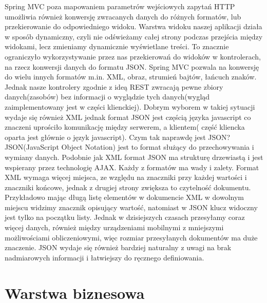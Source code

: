 Spring MVC poza mapowaniem parametrów wejściowych zapytań HTTP umożliwia również konwersję zwracanych danych do różnych formatów, lub przekierowanie do odpowiedniego widoku. Warstwa widoku naszej aplikacji działa w sposób dynamiczny, czyli nie odświeżamy całej strony podczas przejścia między widokami, lecz zmieniamy dynamicznie wyświetlane treści. To znacznie ograniczyło wykorzystywanie przez nas przekierowań do widoków w kontrolerach, na rzecz konwersji danych do formatu JSON. Spring MVC pozwala na konwersję do wielu innych formatów m.in. XML, obraz, strumień bajtów, łańcuch znaków. Jednak nasze kontrolery zgodnie z ideą REST zwracają pewne zbiory danych(zasobów) bez informacji o wyglądzie tych danych(wygląd zaimplementowany jest w części klienckiej). Dobrym wyborem w takiej sytuacji wydaje się również XML jednak format JSON jest częścią języka javascript co znaczeni uprościło komunikację między serwerem, a klientem( część kliencka oparta jest głównie o język javascript).
Czym tak naprawdę jest JSON? JSON(JavaScript Object Notation) jest to format służący do przechowywania i wymiany danych. Podobnie jak XML format JSON ma strukturę drzewiastą i jest wspierany przez technologię AJAX. Każdy z formatów ma wady i zalety. Format XML wymaga więcej miejsca, ze względu na znaczniki przy każdej wartości i znaczniki końcowe, jednak z drugiej strony zwiększa to czytelność dokumentu. Przykładowo mając długą listę elementów w dokumencie XML w dowolnym miejscu widzimy znacznik opisujący wartość, natomiast w JSON klucz widoczny jest tylko na początku listy. Jednak w dzisiejszych czasach przesyłamy coraz więcej danych, również między urządzeniami mobilnymi z mniejszymi możliwościami obliczeniowymi, więc rozmiar przesyłanych dokumentów ma duże znaczenie. JSON wydaje się również bardziej naturalny z uwagi na brak nadmiarowych informacji i łatwiejszy do ręcznego definiowania. 


\section{Warstwa biznesowa}

